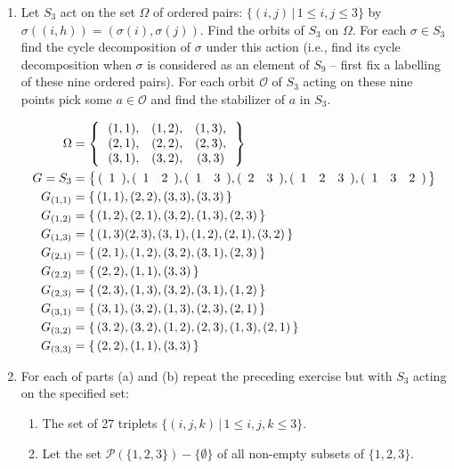 \documentclass[10pt,a4paper]{report}
\newcommand{\BLUE}[1]{\textcolor{blue}{#1}}
\begin{document}
\begin{enumerate}
	\item Let $S_3$ act on the set $\Omega$ of ordered pairs: $\{(i,j)\,|\, 1\le i, j\le 3\}$ by $\sigma((i,h))=(\sigma(i),\sigma(j))$.  Find the orbits of $S_3$ on $\Omega$.  For each $\sigma \in S_3$ find the cycle decomposition of $\sigma$ under this action (i.e., find its cycle decomposition when $\sigma$ is considered as an element of $S_9$ -- first fix a labelling of these nine ordered pairs).  For each orbit $\mathcal{O}$ of $S_3$ acting on these nine points pick some $a \in \mathcal{O}$ and find the stabilizer of $a$ in $S_3$.
	
	\BLUE{
	\begin{align*}
		\Omega &= \left \{\,  \begin{array}{ccc}
			(1,1), & (1,2), & (1,3), \\
			(2,1), & (2,2), & (2,3), \\
			(3,1), & (3,2), & (3,3)		
		\end{array}  \,\right \} \\
		G=S_3 &= \left \{\,  (\begin{array}{cccccccccc} 1 \end{array}), (\begin{array}{cccccccccc} 1&2 \end{array}), (\begin{array}{cccccccccc} 1&3 \end{array}), (\begin{array}{cccccccccc} 2&3 \end{array}), (\begin{array}{cccccccccc} 1&2&3 \end{array}), (\begin{array}{cccccccccc} 1&3&2 \end{array}) \,\right \} \\
		G_{(1,1)} &= \left \{\,  (1,1), (2,2), (3,3), (3,3) \,\right \}\\
		G_{(1,2)} &= \left \{\,  (1,2), (2,1), (3,2), (1,3), (2,3) \,\right \} \\
		G_{(1,3)} &=\left \{\,  (1,3) (2,3), (3,1), (1,2), (2,1), (3,2)  \,\right \} \\
		G_{(2,1)} &= \left \{\, (2,1), (1,2), (3,2), (3,1), (2,3) \,\right \} \\
		G_{(2,2)} &= \left \{\, (2,2), (1,1), (3,3) \,\right \} \\
		G_{(2,3)} &= \left \{\, (2,3), (1,3), (3,2), (3,1), (1,2) \,\right \}\\
		G_{(3,1)} &= \left \{\,  (3,1), (3,2), (1,3), (2,3), (2,1) \,\right \} \\
		G_{(3,2)} &= \left \{\, (3,2), (3,2), (1,2), (2,3), (1,3), (2,1) \,\right \} \\
		G_{(3,3)} &= \left \{\, (2,2), (1,1), (3,3) \,\right \} 
	\end{align*}
}
	
	\item For each of parts (a) and (b) repeat the preceding exercise but with $S_3$ acting on the specified set:
	\begin{enumerate}
		\item The set of 27 triplets $\{(i,j,k)\,|\,1 \le i,j,k \le 3\}$.
		\item Let the set $\mathcal{P}(\{1,2,3\})-\{\emptyset\}$ of all non-empty subsets of $\{1,2,3\}$.
	\end{enumerate}
	

\end{enumerate}
\end{document}
